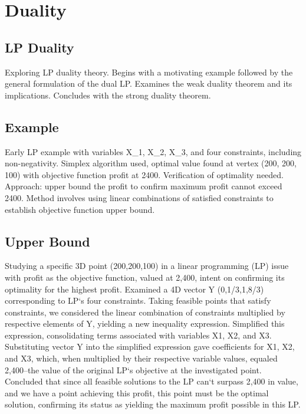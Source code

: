 \section*{Duality}

\subsection*{LP Duality}
Exploring LP duality theory.
Begins with a motivating example followed by the general formulation of the dual LP\@.
Examines the weak duality theorem and its implications.
Concludes with the strong duality theorem.

\subsection*{Example}
Early LP example with variables X\_1, X\_2, X\_3, and four constraints, including non-negativity.
Simplex algorithm used, optimal value found at vertex (200, 200, 100) with objective function profit at 2400.
Verification of optimality needed.
Approach: upper bound the profit to confirm maximum profit cannot exceed 2400.
Method involves using linear combinations of satisfied constraints to establish objective function upper bound.

\subsection*{Upper Bound}
Studying a specific 3D point (200,200,100) in a linear programming (LP) issue with profit as the objective function, valued at 2,400, intent on confirming its optimality for the highest profit.
Examined a 4D vector Y (0,1/3,1,8/3) corresponding to LP`s four constraints.
Taking feasible points that satisfy constraints, we considered the linear combination of constraints multiplied by respective elements of Y, yielding a new inequality expression.
Simplified this expression, consolidating terms associated with variables X1, X2, and X3.
Substituting vector Y into the simplified expression gave coefficients for X1, X2, and X3, which, when multiplied by their respective variable values, equaled 2,400--the value of the original LP`s objective at the investigated point.
Concluded that since all feasible solutions to the LP can`t surpass 2,400 in value, and we have a point achieving this profit, this point must be the optimal solution, confirming its status as yielding the maximum profit possible in this LP\@.

